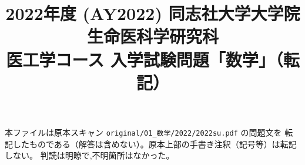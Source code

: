 \documentclass[11pt,a4paper]{article}
\title{2022年度 (AY2022) 同志社大学大学院 生命医科学研究科\\
医工学コース 入学試験問題「数学」（転記）}
\author{}
\date{}
\begin{document}
\maketitle
\vspace{-3em}

\begin{rem}
本ファイルは原本スキャン \texttt{original/01\_数学/2022/2022su.pdf} の問題文を
転記したものである（解答は含めない）。原本上部の手書き注釈（記号等）は転記しない。
判読は明瞭で,不明箇所はなかった。
\end{rem}

\bigskip

\bigskip

\bigskip

\bigskip

\end{document}
